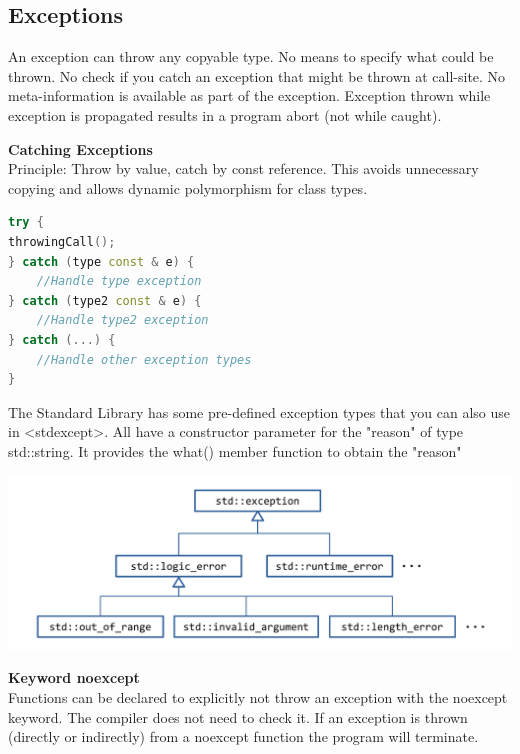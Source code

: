 \subsection{Exceptions}
An exception can throw any copyable type. No means to specify what could be thrown. No check if you catch an exception that might be thrown at call-site. No meta-information is available as part of the exception. Exception thrown while exception is propagated results in a program abort (not while caught). 

\textbf{Catching Exceptions} \\
Principle: Throw by value, catch by const reference. This avoids unnecessary copying and allows dynamic polymorphism for class types.
\begin{lstlisting}[language=C++]
try {
throwingCall(); 
} catch (type const & e) {
	//Handle type exception 
} catch (type2 const & e) {
	//Handle type2 exception 
} catch (...) {
	//Handle other exception types 
}
\end{lstlisting}
The Standard Library has some pre-defined exception types that you can also use in <stdexcept>. All have a constructor parameter for the "reason" of type std::string. It provides the what() member function to obtain the "reason"
\begin{center}
	\includegraphics[width=0.75\linewidth]{images/exceptions}
\end{center}

\textbf{Keyword noexcept} \\
Functions can be declared to explicitly not throw an exception with the noexcept keyword. The compiler does not need to check it.  If an exception is thrown (directly or indirectly) from a noexcept function the program will terminate.

\break